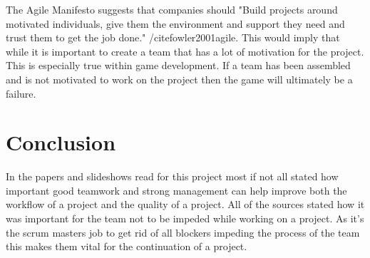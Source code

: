 \documentclass{scrartcl}
\begin{document}
The Agile Manifesto suggests that companies should "Build projects around motivated individuals, give them the environment and support they need and trust them to get the job done." /cite{fowler2001agile}. This would imply that while it is important to create a team that has a lot of motivation for the project. This is especially true within game development. If a team has been assembled and is not motivated to work on the project then the game will ultimately be a failure.

\section{Conclusion}

In the papers and slideshows read for this project most if not all stated how important good teamwork and strong management can help improve both the workflow of a project and the quality of a project. All of the sources stated how it was important for the team not to be impeded while working on a project. As it's the scrum masters job to get rid of all blockers impeding the process of the team this makes them vital for the continuation of a project.



\end{document}
